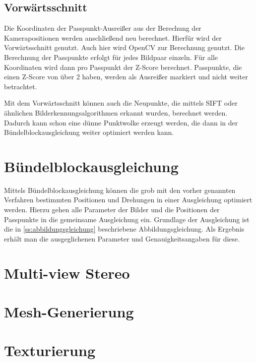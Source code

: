 \documentclass[./00PhotoBox.tex]{subfiles}
\begin{document}
\subsection{Vorwärtsschnitt}
Die Koordinaten der Passpunkt-Ausreißer aus der Berechung der Kamerapositionen werden anschließend neu berechnet. Hierfür wird der Vorwärtsschnitt genutzt. Auch hier wird OpenCV zur Berechnung genutzt. Die Berechnung der Passpunkte erfolgt für jedes Bildpaar einzeln. Für alle Koordinaten wird dann pro Passpunkt der Z-Score berechnet. Passpunkte, die einen Z-Score von über 2 haben, werden als Ausreißer markiert und nicht weiter betrachtet.

Mit dem Vorwärts\-schnitt können auch die Neupunkte, die mittels SIFT oder ähnlichen Bild\-erkennungs\-algorithmen erkannt wurden, berechnet werden. Dadurch kann schon eine dünne Punktwolke erzeugt werden, die dann in der Bündel\-block\-ausgleichung weiter optimiert werden kann.


\section{Bündelblockausgleichung}
\label{s:buendelblock}
Mittels Bündelblockausgleichung können die grob mit den vorher genannten Verfahren bestimmten Positionen und Drehungen in einer Ausgleichung optimiert werden. Hierzu gehen alle Parameter der Bilder und die Positionen der Passpunkte in die gemeinsame Ausgleichung ein. Grundlage der Ausgleichung ist die in \autoref{ss:abbildungsgleichung} beschriebene Abbildungsgleichung. Als Ergebnis erhält man die ausgeglichenen Parameter und Genauigkeitsangaben für diese. \citep[S. 343ff]{luhmann}


\section{Multi-view Stereo}
\citep[S. 505]{luhmann}
\citep[S. 51]{opendronemap}

\section{Mesh-Generierung}

\section{Texturierung}

\biblio
\end{document}
